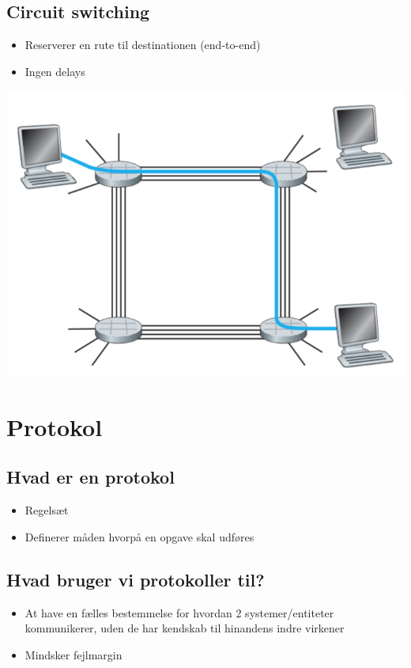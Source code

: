 {\subsection{Circuit switching}
\begin{itemize}
	\item Reserverer en rute til destinationen (end-to-end)
	\item Ingen delays
\end{itemize}

{\includegraphics[scale=0.7]{1-networks/circuit-switched-network.png}

\section{Protokol}

\subsection{Hvad er en protokol}
\begin{itemize}
	\item Regelsæt
	\item Definerer måden hvorpå en opgave skal udføres
\end{itemize}

\subsection{Hvad bruger vi protokoller til?}
\begin{itemize}
	\item At have en fælles bestemmelse for hvordan 2 systemer/entiteter kommunikerer, uden de har kendskab til hinandens indre virkener
	\item Mindsker fejlmargin
\end{itemize}

}}
